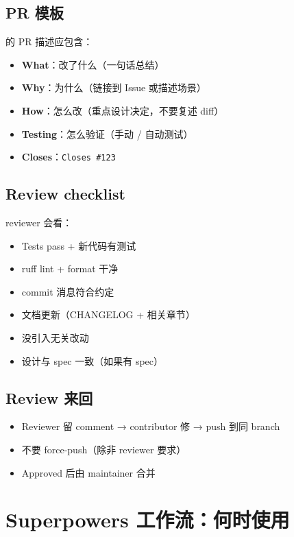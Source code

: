 \subsection{PR 模板}

\openbench{} 的 PR 描述应包含：

\begin{itemize}
  \item \textbf{What}：改了什么（一句话总结）
  \item \textbf{Why}：为什么（链接到 Issue 或描述场景）
  \item \textbf{How}：怎么改（重点设计决定，不要复述 diff）
  \item \textbf{Testing}：怎么验证（手动 / 自动测试）
  \item \textbf{Closes}：\texttt{Closes \#123}
\end{itemize}

\subsection{Review checklist}

reviewer 会看：

\begin{itemize}
  \item Tests pass + 新代码有测试
  \item ruff lint + format 干净
  \item commit 消息符合约定
  \item 文档更新（CHANGELOG + 相关章节）
  \item 没引入无关改动
  \item 设计与 spec 一致（如果有 spec）
\end{itemize}

\subsection{Review 来回}

\begin{itemize}
  \item Reviewer 留 comment → contributor 修 → push 到同 branch
  \item 不要 force-push（除非 reviewer 要求）
  \item Approved 后由 maintainer 合并
\end{itemize}

\section{Superpowers 工作流：何时使用}

